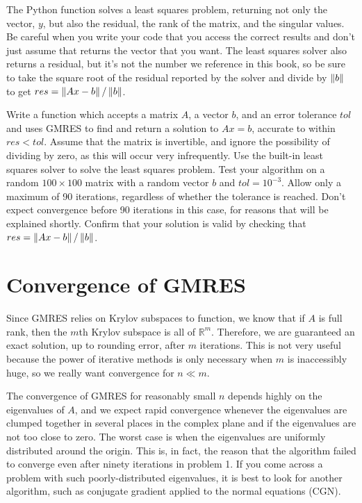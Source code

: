 \begin{warn}
The Python function  solves a least squares problem, returning not only the vector, $y$, but also the residual, the rank of the matrix, and the singular values.
Be careful when you write your code that you access the correct results and don't just assume that  returns the vector that you want.
The least squares solver also returns a residual, but it's not the number we reference in this book, so be sure to take the square root of the residual reported by the solver and divide by $\left\lVert b\right\rVert$ to get $res=\left\lVert Ax-b\right\rVert/\left\lVert b\right\rVert$.
\end{warn}

\begin{problem}
Write a function which accepts a matrix $A$, a vector $b$, and an error tolerance $tol$ and uses GMRES to find and return a solution to $Ax=b$, accurate to within $res < tol$.
Assume that the matrix is invertible, and ignore the possibility of dividing by zero, as this will occur very infrequently.
Use the built-in least squares solver to solve the least squares problem.
Test your algorithm on a random $100\times 100$ matrix with a random vector $b$ and $tol=10^{-3}$.
Allow only a maximum of 90 iterations, regardless of whether the tolerance is reached.
Don't expect convergence before 90 iterations in this case, for reasons that will be explained shortly.
Confirm that your solution is valid by checking that $res = \left\lVert Ax-b\right\rVert/\left\lVert b\right\rVert$.
\label{prob:MyGMRES}
\end{problem}

\section*{Convergence of GMRES}
Since GMRES relies on Krylov subspaces to function, we know that if $A$ is full rank, then the $m$th Krylov subspace is all of $\mathbb{R}^m$.
Therefore, we are guaranteed an exact solution, up to rounding error, after $m$ iterations.
This is not very useful because the power of iterative methods is only necessary when $m$ is inaccessibly huge, so we really want convergence for $n \ll m$.

The convergence of GMRES for reasonably small $n$ depends highly on the eigenvalues of $A$, and we expect rapid convergence whenever the eigenvalues are clumped together in several places in the complex plane and if the eigenvalues are not too close to zero.
The worst case is when the eigenvalues are uniformly distributed around the origin.
This is, in fact, the reason that the algorithm failed to converge even after ninety iterations in problem 1.
If you come across a problem with such poorly-distributed eigenvalues, it is best to look for another algorithm, such as conjugate gradient applied to the normal equations (CGN).

